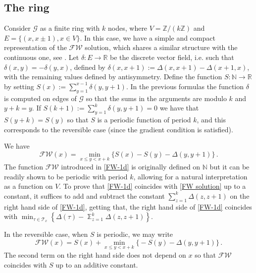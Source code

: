 \documentclass[reqno]{amsart}
\theoremstyle{plain}
\theoremstyle{definition}
\theoremstyle{remark}
\numberwithin{equation}{section}
\numberwithin{theorem}{section}
\newcommand{\<}{\langle}
\renewcommand{\>}{\rangle}
\begin{document}
\subsection{The ring}
Consider $\mathcal{G}$ as a finite ring with $k$ nodes, where $V=\mathbb Z/(k\mathbb Z)$ and $E=\{(x,x\pm 1), x\in V\}$. In this case, we have a simple and compact representation of the $\mathscr{FW}$ solution, which shares a  similar structure with the continuous one, see \cite{FG}. Let $\delta:E \to \mathbb R$ be the discrete vector field, i.e. such that $\delta(x,y)=-\delta(y,x)$, defined by $\delta(x,x+1):=\Delta(x,x+1)-\Delta(x+1,x)$, with the remaining values defined by antisymmetry. Define the function $S:\mathbb N \to \mathbb R$ by setting $S(x):=\sum_{y=1}^{x-1}\delta(y,y+1)$. In the previous formulas the function $\delta$ is computed on edges of $\mathcal G$ so that the sums in the arguments are modulo $k$ and $y+k=y$. If $S(k+1):=\sum_{y=1}^{k}\delta(y,y+1)=0$ we have that $S(y+k)=S(y)$ so that $S$ is a periodic function of period $k$, and this corresponds to the reversible case (since the gradient condition is satisfied).

\smallskip

We have
\begin{equation}\label{FW-1d}
	\mathscr{FW}(x)=\min_{x\leq y< x+k}\Big\{S(x)-S(y)-\Delta(y,y+1)\Big\}\,.
\end{equation}
The function $\mathscr{FW}$ introduced in \eqref{FW-1d} is originally defined on $\mathbb N$  but it can be readily shown to be periodic with period $k$, allowing for a natural interpretation as a function on $V$. To prove that \eqref{FW-1d} coincides with \eqref{FW solution} up to a constant, it suffices to add and subtract the constant $\sum_{z=1}^k\Delta(z,z+1)$  on the right hand side of \eqref{FW-1d},  getting that, the right hand side of \eqref{FW-1d} coincides with $\min_{\tau\in \mathcal T_x}\left\{\Delta(\tau)-\mathbb \sum_{z=1}^k\Delta(z,z+1)\right\}$.

In the reversible case, when $S$ is periodic, we may write
\[
\mathscr{FW}(x)=S(x)+\min_{x\leq y< x+k}\Big\{-S(y)-\Delta(y,y+1)\Big\}\,.
\] 
The second term on the right hand side does not depend on $x$ so that $\mathscr{FW}$ coincides with $S$ up to an additive constant.

\smallskip
\end{document}
